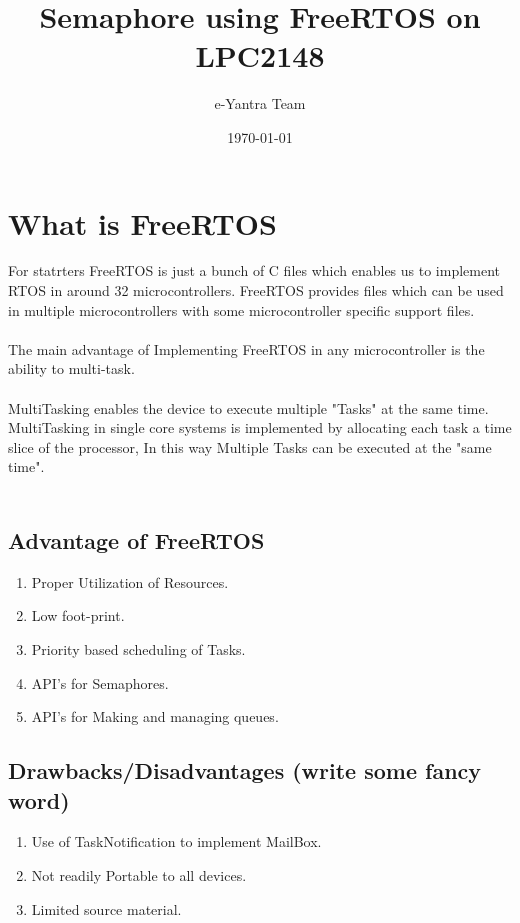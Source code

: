\documentclass[11pt,a4paper]{article}
\title{Semaphore using FreeRTOS on LPC2148}
\author{e-Yantra Team}
\date{\today}
\begin{document}
	\maketitle
	\newpage
	\tableofcontents
	\newpage
	
	\section{What is FreeRTOS}
	
	For statrters FreeRTOS is just a bunch of C files which enables us to implement RTOS in around 32 microcontrollers. FreeRTOS provides files which can be used in multiple microcontrollers with some microcontroller specific support files.
	\\
	\\   
	The main advantage of Implementing FreeRTOS in any microcontroller is the ability to multi-task.
	\\
	\\
	MultiTasking enables the device to execute multiple "Tasks" at the same time.
	MultiTasking in single core systems is implemented by allocating each task a time slice of the processor, In this way Multiple Tasks can be executed at the "same time".
	\\
	\\
	\subsection{Advantage of FreeRTOS}
	\begin{enumerate}
		\item Proper Utilization of Resources.
		\item Low foot-print.
		\item Priority based scheduling of Tasks.
		\item API's for Semaphores.
		\item API's for Making and managing queues.
	\end{enumerate} 

	\subsection{Drawbacks/Disadvantages (write some fancy word)}
	\begin{enumerate}
		\item Use of TaskNotification to implement MailBox.
		\item Not readily Portable to all devices.
		\item Limited source material.
	\end{enumerate} 
\newpage
\end{document}
